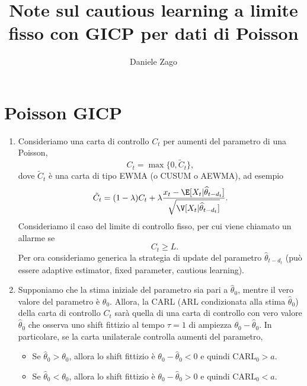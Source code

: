 \documentclass{article}
\author{Daniele Zago}
\title{Note sul cautious learning a limite fisso con GICP per dati di Poisson}
\date{}
\begin{document}
\maketitle

\section{Poisson GICP}\label{sec:Poisson GICP}
\begin{enumerate}[label=\arabic*)]
    \item  Consideriamo una carta di controllo $ C_{t}$ per aumenti del parametro di una Poisson, 
        \[
            C_{t} = \max\{ 0, \tilde{C}_{t} \},
        \]
        dove $ \tilde{C}_{t}$ è una carta di tipo EWMA (o CUSUM o AEWMA), ad esempio
        \[
            \tilde{C}_{t} = (1 - \lambda)C_{t} + \lambda \frac{x_{t} - \E[X_{t}|\widehat{\theta}_{t - d_{t}}]}{\sqrt{\V[X_{t}|\widehat{\theta}_{t - d_{t}}]}}.
        \]
        Consideriamo il caso del limite di controllo fisso, per cui viene chiamato un allarme se
        \[
          \quad C_{t} \ge L.
        \]
        Per ora consideriamo generica la strategia di update del parametro $ \widehat{\theta}_{t-d_{t}}$ (può essere adaptive estimator, fixed parameter, cautious learning).

    \item Supponiamo che la stima iniziale del parametro sia pari a $ \widehat{\theta}_0$, mentre il vero valore del parametro è $ \theta_0$.
        Allora, la CARL ($ \text{ARL}$ condizionata alla stima $ \widehat{\theta}_0$) della carta di controllo $ C_{t}$ sarà quella di una carta di controllo con vero valore $ \widehat{\theta}_0$ che osserva uno shift fittizio al tempo $ \tau = 1$ di ampiezza $ \theta_0 - \widehat{\theta}_0$.
        In particolare, se la carta unilaterale controlla aumenti del parametro,
        \begin{itemize}
            \item Se $ \widehat{\theta}_0 > \theta_0$, allora lo shift fittizio è $ \theta_0 - \widehat{\theta}_0 < 0$ e quindi $ \text{CARL}_0 > a$.
            \item Se $ \widehat{\theta}_0 < \theta_0$, allora lo shift fittizio è $ \theta_0 - \widehat{\theta}_0 > 0$ e quindi $ \text{CARL}_0 < a$.
        \end{itemize}
\end{enumerate}
\end{document}
